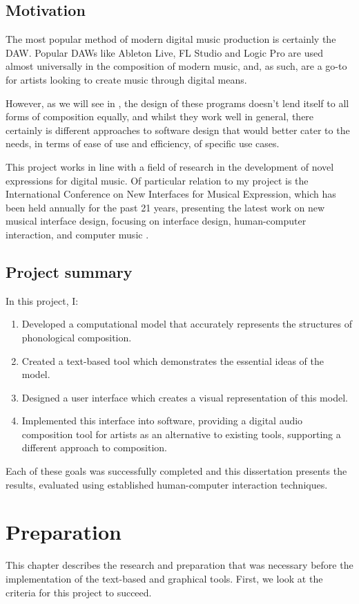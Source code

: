 \documentclass[12pt,a4paper,oneside,openright]{report}
\begin{document}
\section{Motivation}
 The most popular method of modern digital music production is certainly the DAW. Popular DAWs like Ableton Live, FL Studio and Logic Pro are used almost universally in the composition of modern music, and, as such, are a go-to for artists looking to create music through digital means.

 However, as we will see in , the design of these programs doesn't lend itself to all forms of composition equally, and whilst they work well in general, there certainly is different approaches to software design that would better cater to the needs, in terms of ease of use and efficiency, of specific use cases.

 This project works in line with a field of research in the development of novel expressions for digital music. Of particular relation to my project is the International Conference on New Interfaces for Musical Expression, which has been held annually for the past 21 years, presenting the latest work on new musical interface design, focusing on interface design, human-computer interaction, and computer music \cite{NIME}.


\section{Project summary}
In this project, I:
\begin{enumerate}
    \item Developed a computational model that accurately represents the structures of phonological composition.
    \item Created a text-based tool which demonstrates the essential ideas of the model.
    \item Designed a user interface which creates a visual representation of this model.
    \item Implemented this interface into software, providing a digital audio composition tool for artists as an alternative to existing tools, supporting a different approach to composition.
\end{enumerate}

Each of these goals was successfully completed and this dissertation presents the results, evaluated using established human-computer interaction techniques.

\chapter{Preparation}\label{chap:prep}
This chapter describes the research and preparation that was necessary before the implementation of the text-based and graphical tools. First, we look at the criteria for this project to succeed.
\end{document}
